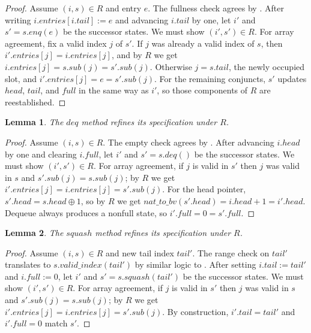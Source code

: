 \documentclass[fontset=fira-newtxsf]{mitthesis}
\theoremstyle{definition}
\theoremstyle{plain}
\newtheorem{lemma}{Lemma}[section]
\begin{document}
\begin{proof}[Proof]
Assume $(i, s) \in R$ and entry $e$.
The fullness check agrees by .
After writing $i.\mathit{entries}[i.\mathit{tail}] := e$ and advancing $i.\mathit{tail}$ by one, let $i'$ and $s' = s.\mathit{enq}(e)$ be the successor states.
We must show $(i', s') \in R$.
For array agreement, fix a valid index $j$ of $s'$.
If $j$ was already a valid index of $s$, then $i'.\mathit{entries}[j] = i.\mathit{entries}[j]$, and by $R$ we get $i.\mathit{entries}[j] = s.\mathit{sub}(j) = s'.\mathit{sub}(j)$.
Otherwise $j = s.\mathit{tail}$, the newly occupied slot, and $i'.\mathit{entries}[j] = e = s'.\mathit{sub}(j)$.
For the remaining conjuncts, $s'$ updates $\mathit{head}$, $\mathit{tail}$, and $\mathit{full}$ in the same way as $i'$, so those components of $R$ are reestablished.
\end{proof}

\begin{lemma} \label{lem:rb-deq}
The $\mathit{deq}$ method refines its specification under $R$.
\end{lemma}

\begin{proof}[Proof]
Assume $(i, s) \in R$.
The empty check agrees by .
After advancing $i.\mathit{head}$ by one and clearing $i.\mathit{full}$, let $i'$ and $s' = s.\mathit{deq}()$ be the successor states.
We must show $(i', s') \in R$.
For array agreement, if $j$ is valid in $s'$ then $j$ was valid in $s$ and $s'.\mathit{sub}(j) = s.\mathit{sub}(j)$; by $R$ we get $i'.\mathit{entries}[j] = i.\mathit{entries}[j] = s'.\mathit{sub}(j)$.
For the head pointer, $s'.\mathit{head} = s.\mathit{head} \oplus 1$, so by $R$ we get $\mathit{nat\_to\_bv}(s'.\mathit{head}) = i.\mathit{head} + 1 = i'.\mathit{head}$.
Dequeue always produces a nonfull state, so $i'.\mathit{full} = 0 = s'.\mathit{full}$.
\end{proof}

\begin{lemma} \label{lem:rb-squash}
The $\mathit{squash}$ method refines its specification under $R$.
\end{lemma}

\begin{proof}[Proof]
Assume $(i, s) \in R$ and new tail index $\mathit{tail}'$.
The range check on $\mathit{tail}'$ translates to $s.\mathit{valid\_index}(\mathit{tail}')$ by similar logic to .
After setting $i.\mathit{tail} := \mathit{tail}'$ and $i.\mathit{full} := 0$, let $i'$ and $s' = s.\mathit{squash}(\mathit{tail}')$ be the successor states.
We must show $(i', s') \in R$.
For array agreement, if $j$ is valid in $s'$ then $j$ was valid in $s$ and $s'.\mathit{sub}(j) = s.\mathit{sub}(j)$; by $R$ we get $i'.\mathit{entries}[j] = i.\mathit{entries}[j] = s'.\mathit{sub}(j)$.
By construction, $i'.\mathit{tail} = \mathit{tail}'$ and $i'.\mathit{full} = 0$ match $s'$.
\end{proof}
\end{document}
